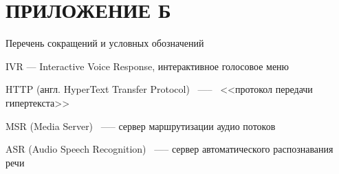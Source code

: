 \chapter{ПРИЛОЖЕНИЕ Б}
\begin{center}
    Перечень сокращений и условных обозначений
\end{center}

\hypertarget{ivr}{IVR --- Interactive Voice Response, интерактивное голосовое меню}

\hypertarget{http}{HTTP (англ. HyperText Transfer Protocol)~ —-- ~<<протокол передачи гипертекста>>}

\hypertarget{msr}{MSR (Media Server)~ —-- сервер маршрутизации аудио потоков}

\hypertarget{asr}{ASR (Audio Speech Recognition)~ —-- сервер автоматического распознавания речи}

\clearpage

